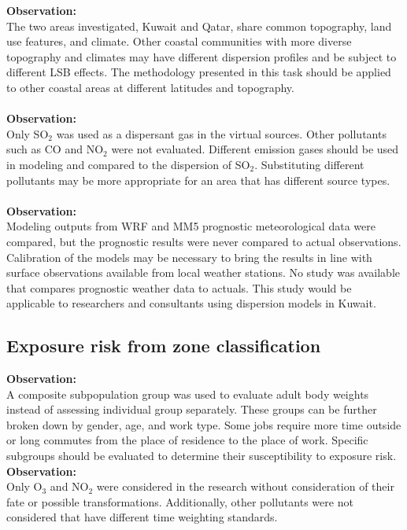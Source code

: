 \noindent
\textbf{Observation:}\\
The two areas investigated, Kuwait and Qatar, share common topography, land use features, and climate. Other coastal communities with more diverse topography and climates may have different dispersion profiles and be subject to different LSB effects. The methodology presented in this task should be applied to other coastal areas at different latitudes and topography.\\
\noindent\\
\textbf{Observation:}\\
Only SO$_{2}$ was used as a dispersant gas in the virtual sources. Other pollutants such as CO and NO$_{2}$ were not evaluated. Different emission gases should be used in modeling and compared to the dispersion of SO$_{2}$. Substituting different pollutants may be more appropriate for an area that has different source types.\\
\noindent\\
\textbf{Observation:}\\
Modeling outputs from WRF and MM5 prognostic meteorological data were compared, but the prognostic results were never compared to actual observations. Calibration of the models may be necessary to bring the results in line with surface observations available from local weather stations. No study was available that compares prognostic weather data to actuals. This study would be applicable to researchers and consultants using dispersion models in Kuwait.

\subsection*{Exposure risk from zone classification}
\noindent
\textbf{Observation:}\\
A composite subpopulation group was used to evaluate adult body weights instead of assessing individual group separately. These groups can be further broken down by gender, age, and work type. Some jobs require more time outside or long commutes from the place of residence to the place of work. Specific subgroups should be evaluated to determine their susceptibility to exposure risk.\\

\noindent
\textbf{Observation:}\\
Only O$_{3}$ and NO$_{2}$ were considered in the research without consideration of their fate or possible transformations. Additionally, other pollutants were not considered that have different time weighting standards. 

